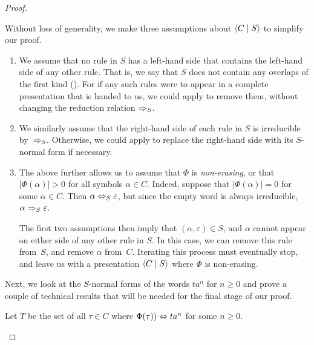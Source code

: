 \documentclass[../generics]{subfiles}
\begin{document}
\begin{proof}
\begin{remark}[Assumptions]\label{remark:c s assumptions}
Without loss of generality, we make three assumptions about $\langle C \mid S\rangle$ to simplify our proof.
\begin{enumerate}
\item
We assume that no rule in $S$ has a left-hand side that contains the left-hand side of any other rule. That is, we say that $S$ does not contain any overlaps of the first kind (). For if any such rules were to appear in a complete presentation that is handed to us, we could apply  to remove them, without changing the reduction relation $\Rightarrow_S$.

\item
We similarly assume that the right-hand side of each rule in $S$ is irreducible by~$\Rightarrow_S$. Otherwise, we could apply  to replace the right-hand side with its $S$-normal form if necessary.

\item
The above further allows us to assume that $\Phi$ is \emph{non-erasing}, or that $|\Phi(\alpha)|>0$ for all symbols $\alpha \in C$. Indeed, suppose that $|\Phi(\alpha)| = 0$ for some $\alpha \in C$. Then $\alpha \Leftrightarrow_S \varepsilon$, but since the empty word is always irreducible, $\alpha \Rightarrow_S \varepsilon$.

The first two assumptions then imply that $(\alpha, \varepsilon) \in S$, and $\alpha$ cannot appear on either side of any other rule in $S$. In this case, we can remove this rule from~$S$, and remove $\alpha$ from~$C$. Iterating this process must eventually stop, and leave us with a presentation $\langle C \mid S\rangle$ where $\Phi$ is non-erasing.
\end{enumerate}
\end{remark}

Next, we look at the $S$-normal forms of the words $ta^n$ for $n \geq 0$ and prove a couple of technical results that will be needed for the final stage of our proof.

\begin{definition}
Let $T$ be the set of all $\tau \in C$ where $\Phi(\tau)) \Leftrightarrow ta^n$ for some $n \geq 0$.
\end{definition}


\end{proof}
\end{document}
